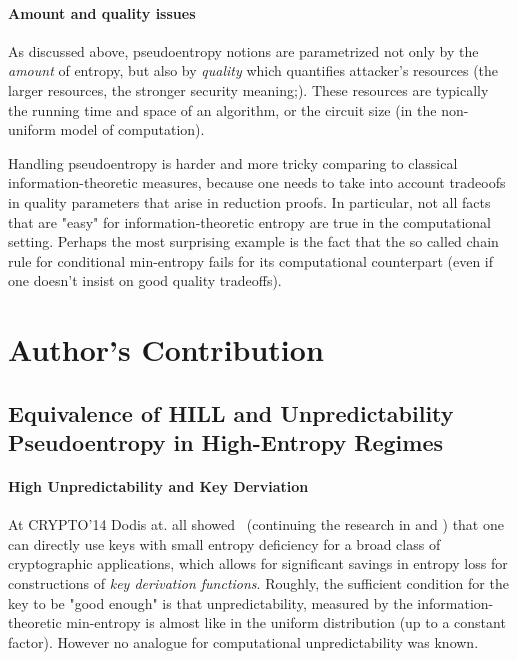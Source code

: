 \documentclass[12pt]{report}
\begin{document}
\paragraph{Amount and quality issues} 
As discussed above, pseudoentropy notions are parametrized not only by the \emph{amount} of entropy, but also by \emph{quality} which quantifies attacker's resources (the larger resources, the stronger security meaning;). These resources are typically
the running time and space of an algorithm, or the circuit size (in the non-uniform model of computation).

Handling pseudoentropy is harder and more tricky comparing to classical information-theoretic measures,
because one needs to take into account tradeoofs in quality parameters that arise in reduction proofs. In particular, not all facts
that are "easy" for information-theoretic entropy are true in the computational setting. 
Perhaps the most surprising example is the fact that the so called chain rule for conditional min-entropy fails for its computational counterpart \cite{DBLP:conf/tcc/KrennPW13} (even if one doesn't insist on good quality tradeoffs).



\section{Author's Contribution}



\subsection{Equivalence of HILL and Unpredictability Pseudoentropy in High-Entropy Regimes}

\paragraph{High Unpredictability and Key Derviation}
At CRYPTO'14 Dodis at. all showed~\cite{DBLP:conf/eurocrypt/DodisPW14} (continuing the research in \cite{DBLP:conf/crypto/BarakDKPPSY11} and \cite{DBLP:conf/tcc/DodisY13}) that one can directly use keys with small entropy deficiency for a broad class of cryptographic applications, which allows 
for significant savings in entropy loss for constructions of \emph{key derivation functions}. Roughly, the sufficient condition for the key to be "good enough" is that unpredictability, measured by the information-theoretic min-entropy is almost like in the uniform distribution (up to a constant factor). However no analogue for computational unpredictability was known.
\end{document}
